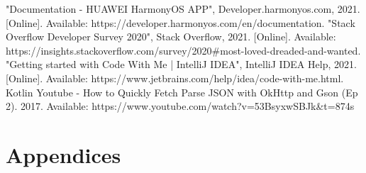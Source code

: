 \begin{thebibliography}{MT1}
"Documentation - HUAWEI HarmonyOS APP", Developer.harmonyos.com, 2021. [Online]. Available: https://developer.harmonyos.com/en/documentation. 
"Stack Overflow Developer Survey 2020", Stack Overflow, 2021. [Online]. Available: https://insights.stackoverflow.com/survey/2020#most-loved-dreaded-and-wanted.
"Getting started with Code With Me | IntelliJ IDEA", IntelliJ IDEA Help, 2021. [Online]. Available: https://www.jetbrains.com/help/idea/code-with-me.html.
Kotlin Youtube - How to Quickly Fetch Parse JSON with OkHttp and Gson (Ep 2). 2017. Available: https://www.youtube.com/watch?v=53BsyxwSBJk&t=874s
\end{thebibliography}
\section{Appendices}
